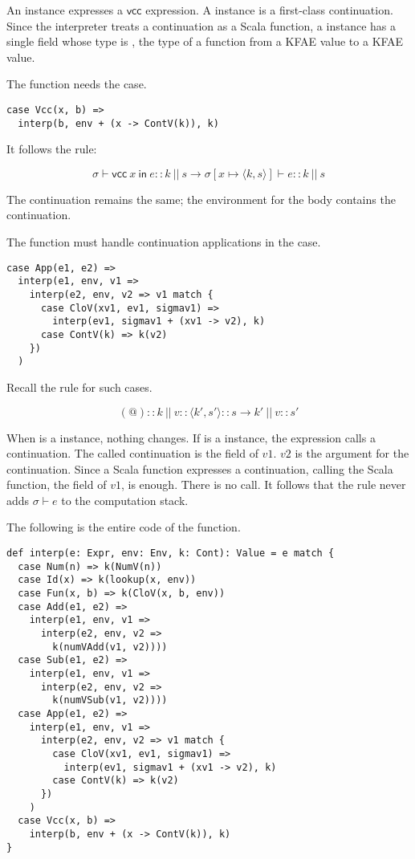 An  instance expresses a $\textsf{vcc}$ expression. A 
instance is a first-class continuation. Since the interpreter treats a
continuation as a Scala function, a  instance has a single field
whose type is , the type of a function from a KFAE value to a KFAE
value.

The  function needs the  case.

\begin{verbatim}
case Vcc(x, b) =>
  interp(b, env + (x -> ContV(k)), k)
\end{verbatim}

It follows the rule:

\[
\sigma\vdash\textsf{vcc}\ x\ \textsf{in}\ e::k\ ||\ s\rightarrow
\sigma[x\mapsto\langle k,s\rangle]\vdash e::k\ ||\ s
\]

The continuation remains the same; the environment for the body contains the
continuation.

The  function must handle continuation applications in the
 case.

\begin{verbatim}
case App(e1, e2) =>
  interp(e1, env, v1 =>
    interp(e2, env, v2 => v1 match {
      case CloV(xv1, ev1, sigmav1) =>
        interp(ev1, sigmav1 + (xv1 -> v2), k)
      case ContV(k) => k(v2)
    })
  )
\end{verbatim}

Recall the rule for such cases.

\[
(@)::k\ ||\ v::\langle k',s'\rangle::s\rightarrow
k'\ ||\ v::s'
\]

When  is a  instance, nothing changes. If  is a
 instance, the expression calls a continuation. The called
continuation is the field of $v1$. $v2$ is the argument for the continuation.
Since a Scala function expresses a continuation, calling the Scala function, the
field of $v1$, is enough. There is no  call. It follows that the
rule never adds $\sigma\vdash e$ to the computation stack.

The following is the entire code of the  function.

\begin{verbatim}
def interp(e: Expr, env: Env, k: Cont): Value = e match {
  case Num(n) => k(NumV(n))
  case Id(x) => k(lookup(x, env))
  case Fun(x, b) => k(CloV(x, b, env))
  case Add(e1, e2) =>
    interp(e1, env, v1 =>
      interp(e2, env, v2 =>
        k(numVAdd(v1, v2))))
  case Sub(e1, e2) =>
    interp(e1, env, v1 =>
      interp(e2, env, v2 =>
        k(numVSub(v1, v2))))
  case App(e1, e2) =>
    interp(e1, env, v1 =>
      interp(e2, env, v2 => v1 match {
        case CloV(xv1, ev1, sigmav1) =>
          interp(ev1, sigmav1 + (xv1 -> v2), k)
        case ContV(k) => k(v2)
      })
    )
  case Vcc(x, b) =>
    interp(b, env + (x -> ContV(k)), k)
}
\end{verbatim}

